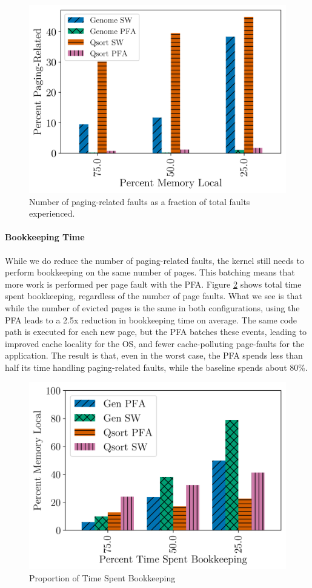   \begin{figure}[h] \centering
    \includegraphics[width=0.7\columnwidth]{figs/swapfault.png}
    \vspace{-5mm}
    \caption{Number of paging-related faults as a fraction of total faults
    experienced.}
    \label{fig:pfa_swapfault}
  \end{figure}
  \FloatBarrier
 
  \paragraph{Bookkeeping Time}
  While we do reduce the number of paging-related faults, the kernel still
  needs to perform bookkeeping on the same number of pages. This batching
  means that more work is performed per page fault with the PFA. Figure
  \ref{fig:pfa_bk_prop} shows total time spent bookkeeping, regardless of the
  number of page faults. What we see is that while the number of evicted pages
  is the same in both configurations, using the PFA leads to a 2.5x reduction
  in bookkeeping time on average. The same code path is executed for each
  new page, but the PFA batches these events, leading to improved cache locality
  for the OS, and fewer cache-polluting page-faults for the application. The
  result is that, even in the worst case, the PFA spends less than half its
  time handling paging-related faults, while the baseline spends about 80\%.

  \begin{figure}[h] \centering
    \includegraphics[width=0.6\columnwidth]{figs/bk_prop_all.png}
    \vspace{-5mm}
    \caption{Proportion of Time Spent Bookkeeping}
    \label{fig:pfa_bk_prop}
  \end{figure}
  \FloatBarrier

